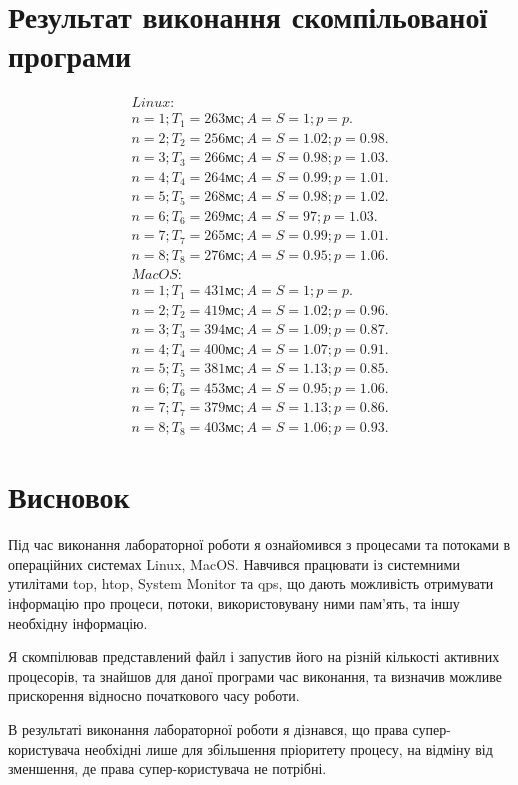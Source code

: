 \documentclass{article}
\begin{document}
\begin{normalsize}
	\section*{Результат виконання скомпільованої програми}
	\begin{gather}
		Linux:\nonumber\\
		n=1; T_1=263\text{мс}; A=S=1; p=p.\nonumber\\
		n=2; T_2 =256\text{мс}; A=S=1.02; p=0.98.\nonumber\\
		n=3; T_3 =266\text{мс}; A=S=0.98; p=1.03.\nonumber\\
		n=4; T_4 =264\text{мс}; A=S=0.99; p=1.01.\nonumber\\
		n=5; T_5 =268\text{мс}; A=S=0.98; p=1.02.\nonumber\\
		n=6; T_6 =269\text{мс}; A=S=97; p=1.03.\nonumber\\
		n=7; T_7 =265\text{мс}; A=S=0.99; p=1.01.\nonumber\\
		n=8; T_8 =276\text{мс}; A=S=0.95; p=1.06.\nonumber\\
		MacOS:\nonumber\\
		n=1; T_1=431\text{мс}; A=S=1; p=p.\nonumber\\
		n=2; T_2 =419\text{мс}; A=S=1.02; p=0.96.\nonumber\\
		n=3; T_3 =394\text{мс}; A=S=1.09; p=0.87.\nonumber\\
		n=4; T_4 =400\text{мс}; A=S=1.07; p=0.91.\nonumber\\
		n=5; T_5 =381\text{мс}; A=S=1.13; p=0.85.\nonumber\\
		n=6; T_6 =453\text{мс}; A=S=0.95; p=1.06.\nonumber\\
		n=7; T_7 =379\text{мс}; A=S=1.13; p=0.86.\nonumber\\
		n=8; T_8 =403\text{мс}; A=S=1.06; p=0.93.\nonumber
	\end{gather}
	
	\section*{Висновок}
	Під час виконання лабораторної роботи я ознайомився з процесами та потоками в операційних системах  Linux, MacOS. Навчився працювати із системними утилітами top, htop, System Monitor та qps, що дають можливість отримувати інформацію про процеси, потоки, використовувану ними пам'ять, та іншу необхідну інформацію. 
	
	Я скомпілював представлений файл і запустив його на різній кількості активних процесорів, та знайшов для даної програми час виконання, та визначив можливе прискорення відносно початкового часу роботи.
	
	В результаті виконання лабораторної роботи я дізнався, що права супер-користувача необхідні лише для збільшення пріоритету процесу, на відміну від зменшення, де права супер-користувача не потрібні.    
\end{normalsize}
\end{document}

